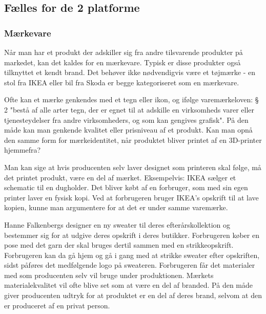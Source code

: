 \subsection{Fælles for de 2 platforme} %


\subsubsection{Mærkevare} %
\label{ssub:m_rkevare}


Når man har et produkt der adskiller sig fra andre tilsvarende produkter på markedet, kan det kaldes for en mærkevare. Typisk er disse produkter også tilknyttet et kendt brand.
Det behøver ikke nødvendigvis være et tøjmærke - en stol fra IKEA eller bil fra Skoda er begge kategoriseret som en mærkevare. 

Ofte kan et mærke genkendes med et tegn eller ikon, og ifølge varemærkeloven: § 2 "bestå af alle arter tegn, der er egnet til at adskille en virksomheds varer eller tjenesteydelser fra andre virksomheders, og som kan gengives grafisk". \autocite{_varemaerkeloven_2012} På den måde kan man genkende kvalitet eller prisniveau af et produkt. 
Kan man opnå den samme form for mærkeidentitet, når produktet bliver printet af en 3D-printer hjemmefra?

Man kan sige at hvis producenten selv laver designet som printeren skal følge, må det printet produkt, være en del af mærket. Eksempelvis: IKEA sælger et schematic til en dugholder. Det bliver købt af en forbruger, som med sin egen printer laver en fysisk kopi. Ved at forbrugeren bruger IKEA’s opskrift til at lave kopien, kunne man argumentere for at det er under samme varemærke. 

Hanne Falkenbergs \autocite{hanne_falkenberg_hanne_????} designer en ny sweater til deres efterårskollektion og bestemmer sig for at udgive deres opskrift i deres butikker. Forbrugeren køber en pose med det garn der skal bruges dertil sammen med en strikkeopskrift. Forbrugeren kan da gå hjem og gå i gang med at strikke sweater efter opskriften, sidst påføres det medfølgende logo på sweateren. Forbrugeren får det materialer med som producenten selv vil bruge under produktionen. Mærkets materialekvalitet vil ofte blive set som at være en del af branded.  På den måde giver producenten udtryk for at produktet er en del af deres brand, selvom at den er produceret af en privat person. 
																
